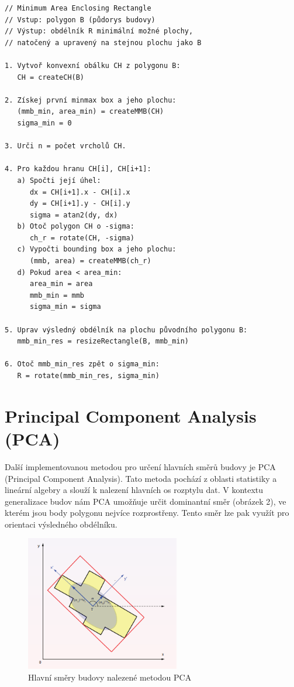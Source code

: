 \documentclass[a4paper,12pt]{article}
\begin{document}
\begin{verbatim}
// Minimum Area Enclosing Rectangle
// Vstup: polygon B (půdorys budovy)
// Výstup: obdélník R minimální možné plochy, 
// natočený a upravený na stejnou plochu jako B

1. Vytvoř konvexní obálku CH z polygonu B:
   CH = createCH(B)

2. Získej první minmax box a jeho plochu:
   (mmb_min, area_min) = createMMB(CH)
   sigma_min = 0

3. Urči n = počet vrcholů CH.

4. Pro každou hranu CH[i], CH[i+1]:
   a) Spočti její úhel:
      dx = CH[i+1].x - CH[i].x
      dy = CH[i+1].y - CH[i].y
      sigma = atan2(dy, dx)
   b) Otoč polygon CH o -sigma:
      ch_r = rotate(CH, -sigma)
   c) Vypočti bounding box a jeho plochu:
      (mmb, area) = createMMB(ch_r)
   d) Pokud area < area_min:
      area_min = area
      mmb_min = mmb
      sigma_min = sigma

5. Uprav výsledný obdélník na plochu původního polygonu B:
   mmb_min_res = resizeRectangle(B, mmb_min)

6. Otoč mmb_min_res zpět o sigma_min:
   R = rotate(mmb_min_res, sigma_min)
\end{verbatim}


\section{Principal Component Analysis (PCA)}
Další implementovanou metodou pro určení hlavních směrů budovy je PCA (Principal Component Analysis). Tato metoda pochází z oblasti statistiky a lineární algebry a slouží k nalezení hlavních os rozptylu dat. V kontextu generalizace budov nám PCA umožňuje určit dominantní směr (obrázek 2), ve kterém jsou body polygonu nejvíce rozprostřeny. Tento směr lze pak využít pro orientaci výsledného obdélníku.

\begin{figure}[H]
    \centering
    \includegraphics[width=0.6\textwidth]{pca.png}
    \caption{Hlavní směry budovy nalezené metodou PCA \parencite{bayer_prednaska}}
    \label{fig:pca} 
\end{figure}
\end{document}
